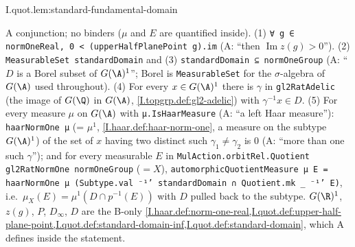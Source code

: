 \begin{tfformal}{I.quot.lem:standard-fundamental-domain}
\begin{tffidelity}
A conjunction; no binders ($\mu$ and $E$ are quantified inside). (1) \texttt{∀ g ∈ normOneReal, 0 < (upperHalfPlanePoint g).im} (A: ``then $\operatorname{Im}z(g)>0$''). (2) \texttt{MeasurableSet standardDomain} and (3) \texttt{standardDomain ⊆ normOneGroup} (A: ``$D$ is a Borel subset of $G(\A)^1$''; Borel is \texttt{MeasurableSet} for the $\sigma$-algebra of $G(\A)$ used throughout). (4) For every $x\in G(\A)^1$ there is $\gamma$ in \texttt{gl2RatAdelic} (the image of $G(\Q)$ in $G(\A)$, \cref{I.topgrp.def:gl2-adelic}) with $\gamma^{-1}x\in D$. (5) For every measure $\mu$ on $G(\A)$ with \texttt{μ.IsHaarMeasure} (A: ``a left Haar measure''): \texttt{haarNormOne μ} (= $\mu^1$, \cref{I.haar.def:haar-norm-one}, a measure on the subtype $G(\A)^1$) of the set of $x$ having two distinct such $\gamma_1\neq\gamma_2$ is $0$ (A: ``more than one such $\gamma$''); and for every measurable $E$ in \texttt{MulAction.orbitRel.Quotient gl2RatNormOne normOneGroup} ($=X$), \texttt{automorphicQuotientMeasure μ E = haarNormOne μ (Subtype.val ⁻¹' standardDomain ∩ Quotient.mk \_ ⁻¹' E)}, i.e.\ $\mu_X(E)=\mu^1(D\cap p^{-1}(E))$ with $D$ pulled back to the subtype. $G(\R)^1$, $z(g)$, $P$, $D_\infty$, $D$ are the B-only \cref{I.haar.def:norm-one-real,I.quot.def:upper-half-plane-point,I.quot.def:standard-domain-inf,I.quot.def:standard-domain}, which A defines inside the statement.
\end{tffidelity}
\end{tfformal}
